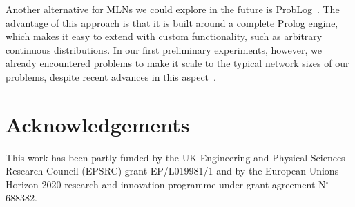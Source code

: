 \documentclass[letterpaper]{article} %
\begin{document}
Another alternative for MLNs we could explore in the future is ProbLog~\cite{fierens2015tplp}. The advantage of this approach is that it is built around a complete Prolog engine, which makes it easy to extend with custom functionality, such as arbitrary continuous distributions. In our first preliminary experiments, however, we already encountered problems to make it scale to the typical network sizes of our problems, despite recent advances in this aspect~\cite{vlasselaer2016ai}.

\section*{Acknowledgements}
This work has been partly funded by the UK Engineering and Physical Sciences Research Council (EPSRC) grant EP/L019981/1 and by the European Unions Horizon 2020 research and innovation programme under grant agreement N$^\circ$ 688382.



\end{document}
